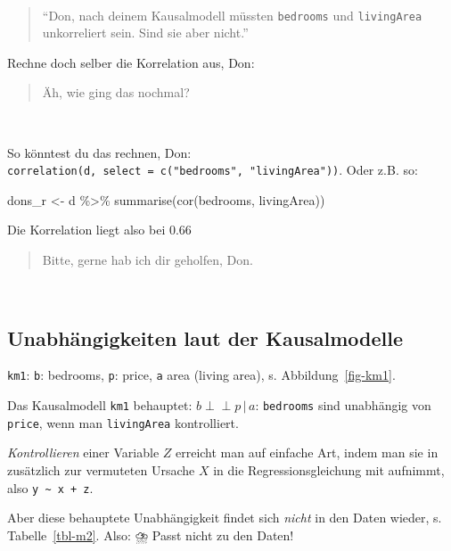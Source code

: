 \documentclass[
  a4paper,
  DIV=11]{scrreprt}
\newenvironment{Shaded}{\begin{snugshade}}{\end{snugshade}}
\newcommand{\FunctionTok}[1]{\textcolor[rgb]{0.28,0.35,0.67}{#1}}
\newcommand{\NormalTok}[1]{\textcolor[rgb]{0.00,0.23,0.31}{#1}}
\newcommand{\OtherTok}[1]{\textcolor[rgb]{0.00,0.23,0.31}{#1}}
\newcommand{\SpecialCharTok}[1]{\textcolor[rgb]{0.37,0.37,0.37}{#1}}
\theoremstyle{definition}
\theoremstyle{remark}
\begin{document}
🧑

\begin{quote}
``Don, nach deinem Kausalmodell müssten \texttt{bedrooms} und
\texttt{livingArea} unkorreliert sein. Sind sie aber nicht.''
\end{quote}

Rechne doch selber die Korrelation aus, Don:

\begin{quote}
Äh, wie ging das nochmal?
\end{quote}

🧑

So könntest du das rechnen, Don:
\texttt{correlation(d,\ select\ =\ c("bedrooms",\ "livingArea"))}. Oder
z.B. so:

\begin{Shaded}
\begin{Highlighting}[]
\NormalTok{dons\_r }\OtherTok{\textless{}{-}}\NormalTok{ d }\SpecialCharTok{\%\textgreater{}\%} 
  \FunctionTok{summarise}\NormalTok{(}\FunctionTok{cor}\NormalTok{(bedrooms, livingArea))}
\end{Highlighting}
\end{Shaded}

Die Korrelation liegt also bei 0.66

\begin{quote}
Bitte, gerne hab ich dir geholfen, Don.
\end{quote}

👩

\hypertarget{unabhuxe4ngigkeiten-laut-der-kausalmodelle}{%
\subsection{Unabhängigkeiten laut der
Kausalmodelle}\label{unabhuxe4ngigkeiten-laut-der-kausalmodelle}}

\texttt{km1}: \texttt{b}: bedrooms, \texttt{p}: price, \texttt{a} area
(living area), s. Abbildung~\ref{fig-km1}.

Das Kausalmodell \texttt{km1} behauptet:
\(b \perp \!\!\! \perp p \, |\, a\): \texttt{bedrooms} sind unabhängig
von \texttt{price}, wenn man \texttt{livingArea} kontrolliert.

\emph{Kontrollieren} einer Variable \(Z\) erreicht man auf einfache Art,
indem man sie in zusätzlich zur vermuteten Ursache \(X\) in die
Regressionsgleichung mit aufnimmt, also
\texttt{y\ \textasciitilde{}\ x\ +\ z}.

Aber diese behauptete Unabhängigkeit findet sich \emph{nicht} in den
Daten wieder, s. Tabelle~\ref{tbl-m2}. Also: ⛈️ Passt nicht zu den
Daten!
\end{document}
